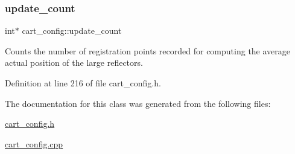 \subsubsection{\texorpdfstring{update\+\_\+count}{update\_count}}
{\footnotesize\ttfamily int$\ast$ cart\+\_\+config\+::update\+\_\+count\hspace{0.3cm}{\ttfamily [private]}}

Counts the number of registration points recorded for computing the average actual position of the large reflectors. 

Definition at line 216 of file cart\+\_\+config.\+h.



The documentation for this class was generated from the following files\+:\begin{DoxyCompactItemize}
\item 
\mbox{\hyperlink{cart__config_8h}{cart\+\_\+config.\+h}}\item 
\mbox{\hyperlink{cart__config_8cpp}{cart\+\_\+config.\+cpp}}\end{DoxyCompactItemize}

